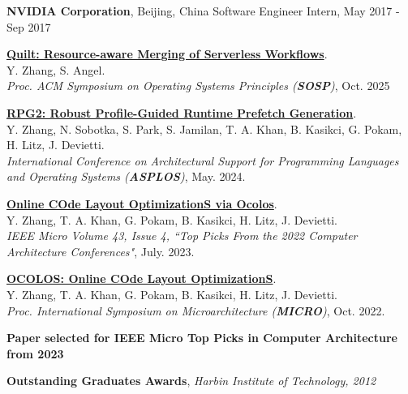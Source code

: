 \documentclass[10pt,a4paper]{article}
\begin{document}
\headedsection
  {\textbf{NVIDIA Corporation}, Beijing, China}
  {\textsc{}} {%
  \headedsubsection
    {Software Engineer Intern, May 2017 - Sep 2017}
    {}{}
}


\headedsection  %
  {{\href{https://dl.acm.org/doi/10.1145/3731569.3764830}{\textbf{Quilt: Resource-aware Merging of Serverless Workflows}}.\\
  Y. Zhang, S. Angel.\\
  \textit{Proc. ACM Symposium on Operating Systems Principles (\textbf{SOSP})}, Oct. 2025}}
  {\textsc{}} {
  }

\headedsection  %
  {{\href{https://dl.acm.org/doi/10.1145/3620665.3640396}{\textbf{RPG2: Robust Profile-Guided Runtime Prefetch Generation}}.\\
  Y. Zhang, N. Sobotka, S. Park, S. Jamilan, T. A. Khan, B. Kasikci, G. Pokam, H. Litz, J. Devietti.\\
  \textit{International Conference on Architectural Support for Programming Languages and Operating Systems (\textbf{ASPLOS})}, May. 2024.}}
  {\textsc{}} {
  }

\headedsection  %
  {{\href{https://dl.acm.org/doi/abs/10.1109/MM.2023.3274758}{\textbf{Online COde Layout OptimizationS via Ocolos}}.\\
  Y. Zhang, T. A. Khan, G. Pokam, B. Kasikci, H. Litz, J. Devietti.\\
  \textit{IEEE Micro Volume 43, Issue 4, ``Top Picks From the 2022 Computer Architecture Conferences"}, July. 2023.}}
  {\textsc{}} {
  }

\headedsection  %
  {{\href{https://dl.acm.org/doi/abs/10.1109/MICRO56248.2022.00045}{\textbf{OCOLOS: Online COde Layout OptimizationS}}.\\
  Y. Zhang, T. A. Khan, G. Pokam, B. Kasikci, H. Litz, J. Devietti.\\
  \textit{Proc. International Symposium on Microarchitecture (\textbf{MICRO})}, Oct. 2022.}}
  {\textsc{}} {
  }


\headedsection  %
  {{\textbf{Paper selected for IEEE Micro Top Picks in Computer Architecture from 2023}}}
  {\textsc{}} {%
}

\headedsection  %
  {{\textbf{Outstanding Graduates Awards}, \textit{\small{Harbin Institute of Technology, 2012}}}}
  {\textsc{}} {%
}
\end{document}
